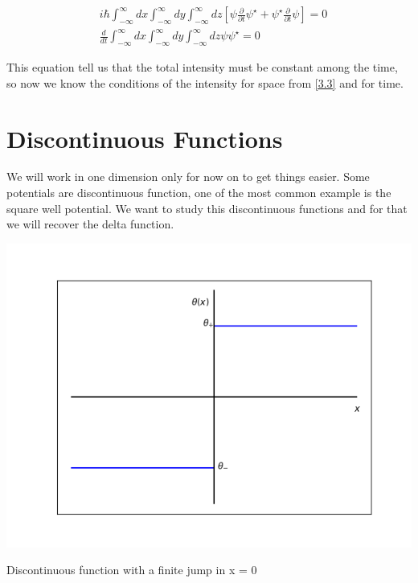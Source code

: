 \begin{equation}
    \label{3.6}
    \begin{split}
    &i\hbar \int_{-\infty}^{\infty}dx\int_{-\infty}^{\infty}dy\int_{-\infty}^{\infty}dz \left[\psi\frac{\partial}{\partial t}\psi^{\star}+\psi^{\star}\frac{\partial}{\partial t}\psi \right] = 0
    \\
    &\frac{d}{dt}\int_{-\infty}^{\infty}dx\int_{-\infty}^{\infty}dy\int_{-\infty}^{\infty}dz \psi \psi^{\star} = 0
    \end{split}
\end{equation}

This equation tell us that the total intensity must be constant among the time, so now we know the conditions of the intensity for space from \ref{3.3} and for time.

\section{Discontinuous Functions}

We will work in one dimension only for now on to get things easier. Some potentials are discontinuous function, one of the most common example is the square well potential. We want to study this discontinuous functions and for that we will recover the delta function.

\begin{marginfigure}
    \includegraphics{images3/theta_func.png}
    \caption{Discontinuous function with a finite jump in x = 0}
    \label{theta_func}
\end{marginfigure}


